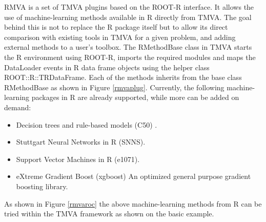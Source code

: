 \documentclass[a4paper]{jpconf}
\begin{document}
RMVA is a set of TMVA plugins based on the ROOT-R interface. It allows the use of machine-learning methods available in R directly from TMVA. The goal behind this is not to replace the R package itself but to allow its direct comparison with existing tools in TMVA for a given problem, and adding external methods to a user’s toolbox.   
The RMethodBase class in TMVA starts the R environment using ROOT-R, imports the required modules and maps the DataLoader events in R data frame objects using the helper class ROOT::R::TRDataFrame.
Each of the methods inherits from the base class RMethodBase as shown in Figure \ref{rmvaplug}. 
Currently, the following machine-learning packages in R are already supported, while more can be added on demand: 


\begin{itemize}  
\item Decision trees and rule-based models (C50) \cite{c50}.
\item Stuttgart Neural Networks in R (SNNS)\cite{rsnns}.
\item Support Vector Machines in R (e1071)\cite{e1071}.
\item eXtreme Gradient Boost (xgboost) An optimized general purpose gradient boosting library\cite{chen2015xgboost}.
\end{itemize}

As shown in Figure \ref{rmvaroc} the above machine-learning methods from R can be tried within the TMVA framework as shown on the basic example.
\end{document}
